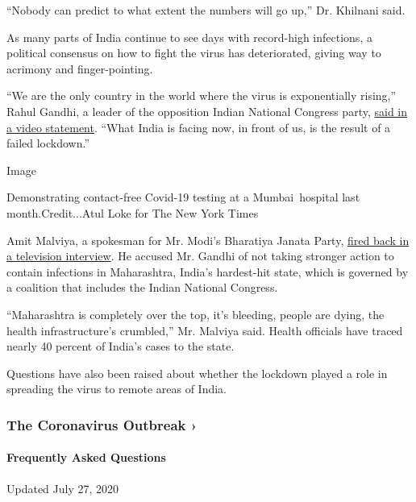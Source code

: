 ``Nobody can predict to what extent the numbers will go up,'' Dr.
Khilnani said.

As many parts of India continue to see days with record-high infections,
a political consensus on how to fight the virus has deteriorated, giving
way to acrimony and finger-pointing.

``We are the only country in the world where the virus is exponentially
rising,'' Rahul Gandhi, a leader of the opposition Indian National
Congress party, \href{https://www.youtube.com/watch?v=HUgfhdafnIg}{said
in a video statement}. ``What India is facing now, in front of us, is
the result of a failed lockdown.''

Image

Demonstrating contact-free Covid-19 testing at a Mumbai~hospital last
month.Credit...Atul Loke for The New York Times

Amit Malviya, a spokesman for Mr. Modi's Bharatiya Janata Party,
\href{https://twitter.com/TimesNow/status/1265194712270430209}{fired
back in a television interview}. He accused Mr. Gandhi of not taking
stronger action to contain infections in Maharashtra, India's
hardest-hit state, which is governed by a coalition that includes the
Indian National Congress.

``Maharashtra is completely over the top, it's bleeding, people are
dying, the health infrastructure's crumbled,'' Mr. Malviya said. Health
officials have traced nearly 40 percent of India's cases to the state.

Questions have also been raised about whether the lockdown played a role
in spreading the virus to remote areas of India.

\href{https://www.nytimes.com/news-event/coronavirus?action=click\&pgtype=Article\&state=default\&region=MAIN_CONTENT_3\&context=storylines_faq}{}

\hypertarget{the-coronavirus-outbreak-}{%
\subsubsection{The Coronavirus Outbreak
›}\label{the-coronavirus-outbreak-}}

\hypertarget{frequently-asked-questions}{%
\paragraph{Frequently Asked
Questions}\label{frequently-asked-questions}}

Updated July 27, 2020

